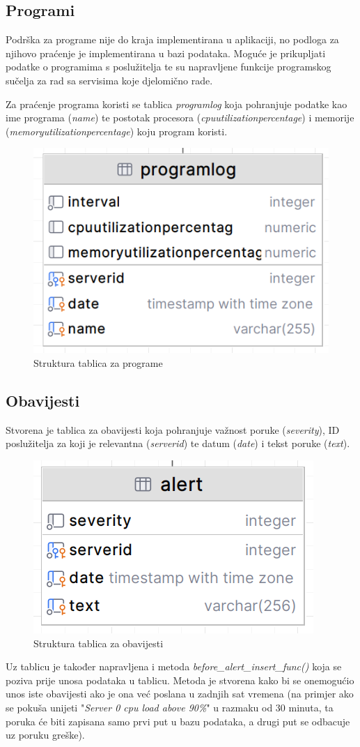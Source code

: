 \documentclass[zavrsnirad]{fer}
\begin{document}
\subsection{Programi}
Podrška za programe nije do kraja implementirana u aplikaciji, no podloga za njihovo praćenje je implementirana u bazi podataka. Moguće je prikupljati podatke o programima s poslužitelja te su napravljene funkcije programskog sučelja za rad sa servisima koje djelomično rade.

Za praćenje programa koristi se tablica \textit{programlog} koja pohranjuje podatke kao ime programa (\textit{name}) te postotak procesora (\textit{cpuutilizationpercentage}) i memorije (\textit{memoryutilizationpercentage}) koju program koristi.

\begin{figure}[htb!]
	\centering
	\includegraphics[width=0.35\linewidth]{images/db_programs.png} 
	\caption{Struktura tablica za programe}
\end{figure}
\FloatBarrier

\subsection{Obavijesti}
Stvorena je tablica za obavijesti koja pohranjuje važnost poruke (\textit{severity}), ID poslužitelja za koji je relevantna (\textit{serverid}) te datum (\textit{date}) i tekst poruke (\textit{text}).

\begin{figure}[htb!]
	\centering
	\includegraphics[width=0.35\linewidth]{images/db_alerts.png} 
	\caption{Struktura tablica za obavijesti}
\end{figure}
\FloatBarrier

Uz tablicu je također napravljena i metoda \textit{before\_alert\_insert\_func()} koja se poziva prije unosa podataka u tablicu. Metoda je stvorena kako bi se onemogućio unos iste obavijesti ako je ona već poslana u zadnjih sat vremena (na primjer ako se pokuša unijeti "\textit{Server 0 cpu load above 90\%}" u razmaku od 30 minuta, ta poruka će biti zapisana samo prvi put u bazu podataka, a drugi put se odbacuje uz poruku greške).
\end{document}
